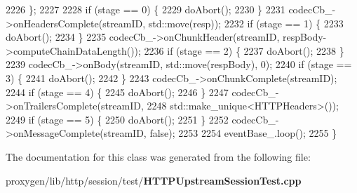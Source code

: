 \begin{DoxyCode}
2226     \};
2227 
2228     \textcolor{keywordflow}{if} (stage == 0) \{
2229       doAbort();
2230     \}
2231     codecCb_->onHeadersComplete(streamID, std::move(resp));
2232     \textcolor{keywordflow}{if} (stage == 1) \{
2233       doAbort();
2234     \}
2235     codecCb_->onChunkHeader(streamID, respBody->computeChainDataLength());
2236     \textcolor{keywordflow}{if} (stage == 2) \{
2237       doAbort();
2238     \}
2239     codecCb_->onBody(streamID, std::move(respBody), 0);
2240     \textcolor{keywordflow}{if} (stage == 3) \{
2241       doAbort();
2242     \}
2243     codecCb_->onChunkComplete(streamID);
2244     \textcolor{keywordflow}{if} (stage == 4) \{
2245       doAbort();
2246     \}
2247     codecCb_->onTrailersComplete(streamID,
2248                                  std::make\_unique<HTTPHeaders>());
2249     \textcolor{keywordflow}{if} (stage == 5) \{
2250       doAbort();
2251     \}
2252     codecCb_->onMessageComplete(streamID, \textcolor{keyword}{false});
2253 
2254     eventBase_.loop();
2255   \}
\end{DoxyCode}


The documentation for this class was generated from the following file\+:\begin{DoxyCompactItemize}
\item 
proxygen/lib/http/session/test/{\bf H\+T\+T\+P\+Upstream\+Session\+Test.\+cpp}\end{DoxyCompactItemize}
